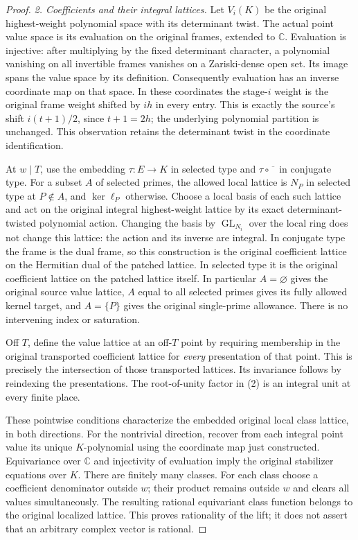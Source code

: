 \begin{proof}
\emph{2. Coefficients and their integral lattices.}
Let $V_i(K)$ be the original highest-weight polynomial space with its
determinant twist.  The actual point value space is its evaluation on
the original frames, extended to $\mathbb C$.  Evaluation is injective:
after multiplying by the fixed determinant character, a polynomial
vanishing on all invertible frames vanishes on a Zariski-dense open
set.  Its image spans the value space by its definition.  Consequently
evaluation has an inverse coordinate map on that space.  In these
coordinates the stage-$i$ weight is the original frame weight shifted
by $ih$ in every entry.  This is exactly the source's shift
$i(t+1)/2$, since $t+1=2h$; the underlying polynomial partition is
unchanged.  This observation retains the determinant twist in the
coordinate identification.

At $w\mid T$, use the embedding $\tau:E\to K$ in selected type
and $\tau\circ\overline{\phantom{x}}$ in conjugate type.
For a subset $A$ of selected primes, the allowed local lattice is
$N_P$ in selected type at $P\notin A$, and $\ker\ell_P$ otherwise.
Choose a local basis of each such lattice and act on the original
integral highest-weight lattice by its exact determinant-twisted
polynomial action.  Changing the basis by $\operatorname{GL}_{N_i}$
over the local ring does not change this lattice: the action and its
inverse are integral.  In conjugate type the frame is the dual frame,
so this construction is the original coefficient lattice on the
Hermitian dual of the patched lattice.  In selected type it is the
original coefficient lattice on the patched lattice itself.  In
particular $A=\varnothing$ gives the original source value lattice,
$A$ equal to all selected primes gives its fully allowed kernel
target, and $A=\{P\}$ gives the original single-prime allowance.
There is no intervening index or saturation.

Off $T$, define the value lattice at an off-$T$ point by requiring
membership in the original transported coefficient lattice for
\emph{every} presentation of that point.  This is precisely the
intersection of those transported lattices.  Its invariance follows
by reindexing the presentations.  The root-of-unity factor in (2) is
an integral unit at every finite place.

These pointwise conditions characterize the embedded original local
class lattice, in both directions.  For the nontrivial direction,
recover from each integral point value its unique $K$-polynomial
using the coordinate map just constructed.  Equivariance over
$\mathbb C$ and injectivity of evaluation imply the original
stabilizer equations over $K$.  There are finitely many classes.
For each class choose a coefficient denominator outside $w$; their
product remains outside $w$ and clears all values simultaneously.
The resulting rational equivariant class function belongs to the
original localized lattice.  This proves rationality of the lift;
it does not assert that an arbitrary complex vector is rational.


\end{proof}
